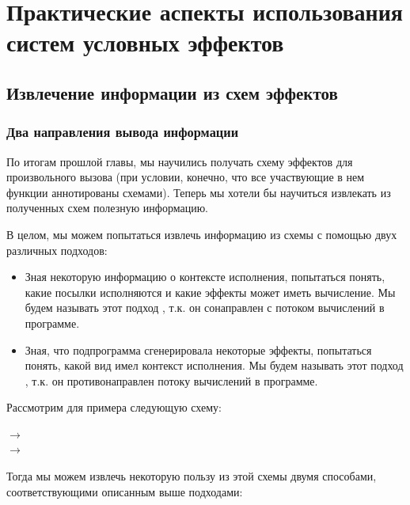 \section{Практические аспекты использования систем условных эффектов}

\subsection{Извлечение информации из схем эффектов}

\label{section-info-gathering}

\subsubsection{Два направления вывода информации}

По итогам прошлой главы, мы научились получать схему эффектов для произвольного вызова (при условии, конечно, что все участвующие в нем функции аннотированы схемами). Теперь мы хотели бы научиться извлекать из полученных схем полезную информацию.

В целом, мы можем попытаться извлечь информацию из схемы с помощью двух различных подходов:

\begin{itemize}
    \item Зная некоторую информацию о контексте исполнения, попытаться понять, какие посылки исполняются и какие эффекты может иметь вычисление. Мы будем называть этот подход , т.к. он сонаправлен с потоком вычислений в программе.

    \item Зная, что подпрограмма сгенерировала некоторые эффекты, попытаться понять, какой вид имел контекст исполнения. Мы будем называть этот подход , т.к. он противонаправлен потоку вычислений в программе.

\end{itemize}

Рассмотрим для примера следующую схему:

{
     $\rightarrow$  \\
     $\rightarrow$ 
}{}

Тогда мы можем извлечь некоторую пользу из этой схемы двумя способами, соответствующими описанным выше подходами:

